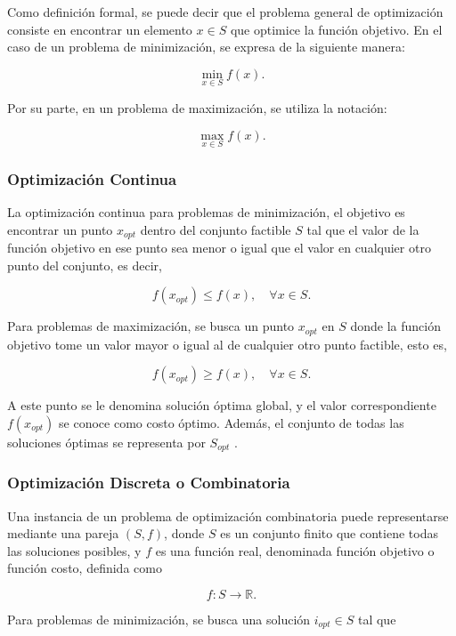 \documentclass[12pt,titlepage,twoside,openright]{book}
\begin{document}
Como definición formal, se puede decir que el problema general de optimización consiste en encontrar un elemento \(x \in S\) que optimice la función objetivo. En el caso de un problema de minimización, se expresa de la siguiente manera:

\[
	\min_{x \in S} f(x).
\]

Por su parte, en un problema de maximización, se utiliza la notación:

\[
	\max_{x \in S} f(x).
\]

\citep{cobos2010}


\subsubsection{Optimización Continua}

La optimización continua para problemas de minimización, el objetivo es encontrar un punto \( x_{opt} \) dentro del conjunto factible \( S \) tal que el valor de la función objetivo en ese punto sea menor o igual que el valor en cualquier otro punto del conjunto, es decir,

\[
	f(x_{opt}) \leq f(x), \quad \forall x \in S.
\]

Para problemas de maximización, se busca un punto \( x_{opt} \) en \( S \) donde la función objetivo tome un valor mayor o igual al de cualquier otro punto factible, esto es,

\[
	f(x_{opt}) \geq f(x), \quad \forall x \in S.
\]

A este punto se le denomina solución óptima global, y el valor correspondiente \( f(x_{opt}) \) se conoce como costo óptimo. Además, el conjunto de todas las soluciones óptimas se representa por \( S_{opt} \) \citep{cobos2010}.


\subsubsection{Optimización Discreta o Combinatoria}
\label{subsec:opt_discreta}

Una instancia de un problema de optimización combinatoria puede representarse mediante una pareja \((S, f)\), donde \(S\) es un conjunto finito que contiene todas las soluciones posibles, y \(f\) es una función real, denominada función objetivo o función costo, definida como

\[
	f: S \to \mathbb{R}.
\]

Para problemas de minimización, se busca una solución \(i_{opt} \in S\) tal que
\end{document}

